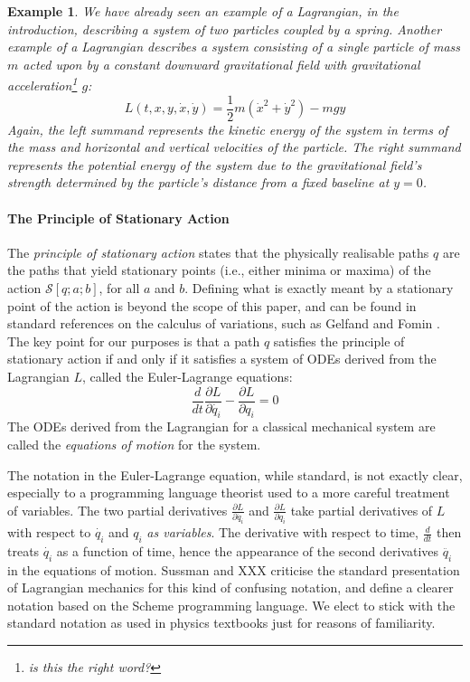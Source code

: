 \documentclass[preprint]{sigplanconf}
\theoremstyle{examplestyle}
\newtheorem{example}{Example}
\begin{document}
\begin{example}
  We have already seen an example of a Lagrangian, in the
  introduction, describing a system of two particles coupled by a
  spring. Another example of a Lagrangian describes a system
  consisting of a single particle of mass $m$ acted upon by a constant
  downward gravitational field with gravitational acceleration\footnote{is this the right word?} $g$:
  \begin{equation}\label{eq:simple-g-lagrangian}
    L(t,x,y,\dot{x},\dot{y}) = \frac{1}{2}m(\dot{x}^2 + \dot{y}^2) - mgy
  \end{equation}
  Again, the left summand represents the kinetic energy of the system
  in terms of the mass and horizontal and vertical velocities of the
  particle. The right summand represents the potential energy of the
  system due to the gravitational field's strength determined by the
  particle's distance from a fixed baseline at $y = 0$.
\end{example}

\paragraph{The Principle of Stationary Action}

The \emph{principle of stationary action} states that the physically
realisable paths $q$ are the paths that yield stationary points (i.e.,
either minima or maxima) of the action $\mathcal{S}[q;a;b]$, for all
$a$ and $b$. Defining what is exactly meant by a stationary point of
the action is beyond the scope of this paper, and can be found in
standard references on the calculus of variations, such as Gelfand and
Fomin \cite{gelfandXXcalculus}. The key point for our purposes is that
a path $q$ satisfies the principle of stationary action if and only if
it satisfies a system of ODEs derived from the Lagrangian $L$, called
the Euler-Lagrange equations:
\begin{equation}\label{eq:euler-lagrange}
  \frac{d}{dt}\frac{\partial L}{\partial \dot{q_i}} - \frac{\partial L}{\partial q_i} = 0
\end{equation}
The ODEs derived from the Lagrangian for a classical mechanical system
are called the \emph{equations of motion} for the system.

The notation in the Euler-Lagrange equation, while standard, is not
exactly clear, especially to a programming language theorist used to a
more careful treatment of variables. The two partial derivatives
$\frac{\partial L}{\partial \dot{q_i}}$ and $\frac{\partial
  L}{\partial q_i}$ take partial derivatives of $L$ with respect to
$\dot{q_i}$ and $q_i$ \emph{as variables}. The derivative with respect
to time, $\frac{d}{dt}$ then treats $\dot{q_i}$ as a function of time,
hence the appearance of the second derivatives $\ddot{q_i}$ in the
equations of motion. Sussman and XXX \cite{sussman} criticise the
standard presentation of Lagrangian mechanics for this kind of
confusing notation, and define a clearer notation based on the Scheme
programming language. We elect to stick with the standard notation as
used in physics textbooks just for reasons of familiarity.
\end{document}
